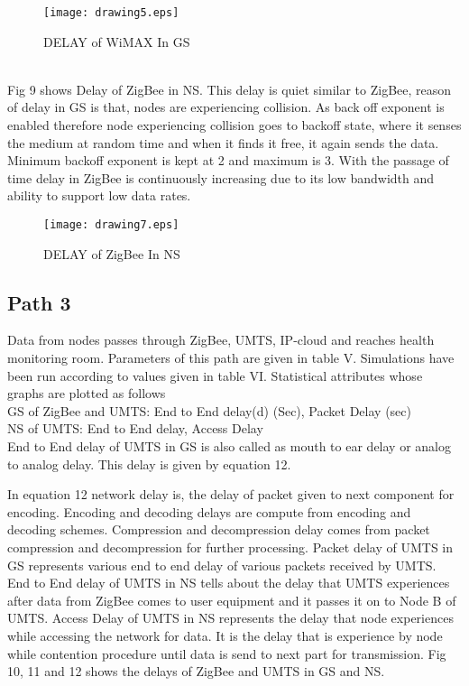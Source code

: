 \documentclass[11pt, conference, compsocconf, onecolumn]{IEEEtran}
\begin{document}
\begin{figure}[!b]
\centering
\caption{DELAY of WiMAX In GS}
\texttt{[image: drawing5.eps]}
\end{figure}
\\
\indent Fig 9 shows Delay of ZigBee in NS. This delay is quiet similar to ZigBee, reason of delay in GS is that, nodes are experiencing collision. As back off exponent is enabled therefore node experiencing collision goes to backoff state, where it senses the medium at random time and when it finds it free, it again sends the data. Minimum backoff exponent is kept at 2 and maximum is 3. With the passage of time delay in ZigBee is continuously increasing due to its low bandwidth and ability to support low data rates.
\begin{figure}[!h]
\centering
\caption{DELAY of ZigBee In NS}
\texttt{[image: drawing7.eps]}
\end{figure}
\subsection{Path 3}
Data from nodes passes through ZigBee, UMTS, IP-cloud and reaches health monitoring room. Parameters of this path are given in table V. Simulations have been run according to values given in table VI. Statistical attributes whose graphs are plotted as follows \\
\indent GS of ZigBee and UMTS: End to End delay(d) (Sec), Packet Delay (sec)\\
\indent NS of UMTS: End to End delay, Access Delay
\\
\indent End to End delay of UMTS in GS is also called as mouth to ear delay or analog to analog delay. This delay is given by equation 12.

\indent In equation 12 network delay is, the delay of packet given to next component for encoding. Encoding and decoding delays are compute from encoding and decoding schemes. Compression and decompression delay comes from packet compression and decompression for further processing. Packet delay of UMTS in GS represents various end to end delay of various packets received by UMTS. \\
\indent End to End delay of UMTS in NS tells about the delay that UMTS experiences after data from ZigBee comes to user equipment and it passes it on to Node B of UMTS. Access Delay of UMTS in NS represents the delay that node experiences while accessing the network for data. It is the delay that is experience by node while contention procedure until data is send to next part for transmission. Fig 10, 11 and 12 shows the delays of ZigBee and UMTS in GS and NS.
\end{document}
